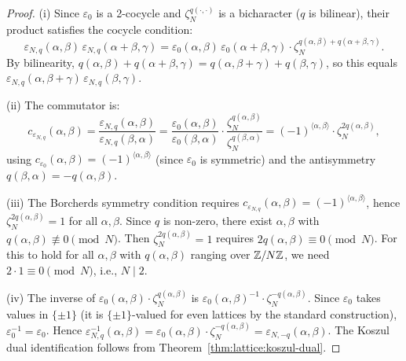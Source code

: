 \begin{proof}
(i) Since $\varepsilon_0$ is a 2-cocycle and $\zeta_N^{q(\cdot,\cdot)}$
is a bicharacter ($q$ is bilinear), their product satisfies the
cocycle condition:
\[
\varepsilon_{N,q}(\alpha,\beta)\,
\varepsilon_{N,q}(\alpha+\beta,\gamma)
= \varepsilon_0(\alpha,\beta)\,\varepsilon_0(\alpha+\beta,\gamma)
  \cdot \zeta_N^{q(\alpha,\beta) + q(\alpha+\beta,\gamma)}.
\]
By bilinearity, $q(\alpha,\beta) + q(\alpha+\beta,\gamma)
= q(\alpha,\beta+\gamma) + q(\beta,\gamma)$, so this equals
$\varepsilon_{N,q}(\alpha,\beta+\gamma)\,
\varepsilon_{N,q}(\beta,\gamma)$.

(ii) The commutator is:
\[
c_{\varepsilon_{N,q}}(\alpha,\beta)
= \frac{\varepsilon_{N,q}(\alpha,\beta)}%
       {\varepsilon_{N,q}(\beta,\alpha)}
= \frac{\varepsilon_0(\alpha,\beta)}%
       {\varepsilon_0(\beta,\alpha)}
  \cdot \frac{\zeta_N^{q(\alpha,\beta)}}%
             {\zeta_N^{q(\beta,\alpha)}}
= (-1)^{\langle\alpha,\beta\rangle}
  \cdot \zeta_N^{2q(\alpha,\beta)},
\]
using $c_{\varepsilon_0}(\alpha,\beta) =
(-1)^{\langle\alpha,\beta\rangle}$
(since $\varepsilon_0$ is symmetric) and the antisymmetry
$q(\beta,\alpha) = -q(\alpha,\beta)$.

(iii) The Borcherds symmetry condition requires
$c_{\varepsilon_{N,q}}(\alpha,\beta) =
(-1)^{\langle\alpha,\beta\rangle}$,
hence $\zeta_N^{2q(\alpha,\beta)} = 1$ for all $\alpha, \beta$.
Since $q$ is non-zero, there exist $\alpha, \beta$ with
$q(\alpha,\beta) \not\equiv 0 \pmod{N}$.  Then
$\zeta_N^{2q(\alpha,\beta)} = 1$ requires
$2q(\alpha,\beta) \equiv 0 \pmod{N}$.  For this to hold for all
$\alpha,\beta$ with $q(\alpha,\beta)$ ranging over $\mathbb{Z}/N\mathbb{Z}$,
we need $2 \cdot 1 \equiv 0 \pmod{N}$, i.e., $N \mid 2$.

(iv) The inverse of $\varepsilon_0(\alpha,\beta) \cdot
\zeta_N^{q(\alpha,\beta)}$ is
$\varepsilon_0(\alpha,\beta)^{-1} \cdot
\zeta_N^{-q(\alpha,\beta)}$.  Since $\varepsilon_0$ takes values in
$\{\pm 1\}$ (it is $\{\pm 1\}$-valued for even lattices by the
standard construction), $\varepsilon_0^{-1} = \varepsilon_0$.  Hence
$\varepsilon_{N,q}^{-1}(\alpha,\beta) =
\varepsilon_0(\alpha,\beta) \cdot \zeta_N^{-q(\alpha,\beta)}
= \varepsilon_{N,-q}(\alpha,\beta)$.
The Koszul dual identification follows from
Theorem~\ref{thm:lattice:koszul-dual}.
\end{proof}

